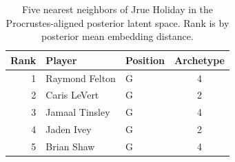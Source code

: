 \begin{table}[htbp]
  \centering\small
  \begin{tabular}{rllc}
    \toprule
    Rank & Player & Position & Archetype \\
    \midrule
    1 & Raymond Felton & G & 4 \\
    2 & Caris LeVert & G & 2 \\
    3 & Jamaal Tinsley & G & 4 \\
    4 & Jaden Ivey & G & 2 \\
    5 & Brian Shaw & G & 4 \\
    \bottomrule
  \end{tabular}
  \caption{Five nearest neighbors of Jrue Holiday in the Procrustes-aligned posterior latent space. Rank is by posterior mean embedding distance.}
  \label{tab:Jrue_Holiday_neighbors}
\end{table}

